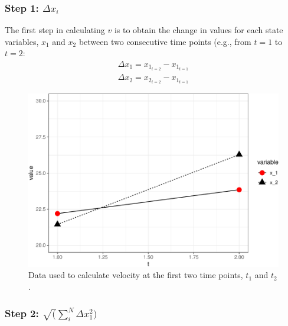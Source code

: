 \documentclass[12pt,twoside,openany]{reedthesis}
\begin{document}
\hypertarget{step-1-delta-x_i}{%
\subsubsection{\texorpdfstring{Step 1: \(\Delta x_i\)}{Step 1: \textbackslash{}Delta x\_i}}\label{step-1-delta-x_i}}

The first step in calculating \(v\) is to obtain the change in values for each state variables, \(x_1\) and \(x_2\) between two consecutive time points (e.g., from \(t=1\) to \(t=2\):
\begin{equation}
\begin{array}{rcr}
\Delta x_1 = x_{1_{t=2}} - x_{1_{t=1}} \\
\Delta x_2 = x_{2_{t=2}} - x_{1_{t=1}}
  \end{array}
\label{eq:diffX}
\end{equation}
\begin{figure}[h]

{\centering \includegraphics[width=0.95\linewidth]{_myDissertation_files/figure-latex/sysEx2-1} 

}

\caption{Data used to calculate velocity at the first two time points, $t_1$ and $t_2$.}\label{fig:sysEx2}
\end{figure}
\hypertarget{step-2-sqrtsum_indelta-x_12}{%
\subsubsection{\texorpdfstring{Step 2: \(\sqrt(\sum_i^N\Delta x_1^2)\)}{Step 2: \textbackslash{}sqrt(\textbackslash{}sum\_i\^{}N\textbackslash{}Delta x\_1\^{}2)}}\label{step-2-sqrtsum_indelta-x_12}}
\end{document}
